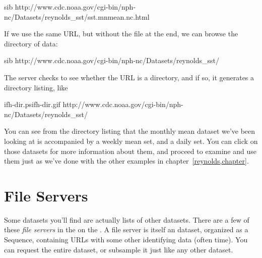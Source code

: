 \documentclass{dods-book}
\begin{document}
\begin{vcode}[.]{sib}
http://www.cdc.noaa.gov/cgi-bin/nph-nc/Datasets/reynolds_sst/sst.mnmean.nc.html
\end{vcode}

If we use the same URL, but without the file at the end, we can browse
the directory of data:

\begin{vcode}[.]{sib}
http://www.cdc.noaa.gov/cgi-bin/nph-nc/Datasets/reynolds_sst/
\end{vcode}

The \opendap server checks to see whether the URL is a directory, and if
so, it generates a directory listing, like 

%
{ifh-dir.ps}{ifh-dir.gif}%
{http://www.cdc.noaa.gov/cgi-bin/nph-nc/Datasets/reynolds_sst/}

You can see from the directory listing that the monthly mean dataset
we've been looking at is accompanied by a weekly mean set, and a daily
set.  You can click on those datasets for more information about them,
and proceed to examine and use them just as we've done with the other
examples in chapter~\ref{reynolds,chapter}.


\section{File Servers}

Some datasets you'll find are actually lists of other datasets.  There
are a few of these \emph{file servers} in the  on the
\OPDhome .  A file server is itself an \opendap dataset, organized as a
Sequence, containing URLs with some other identifying data (often time).  You
can request the entire dataset, or subsample it just like any other
\opendap dataset.
\end{document}
